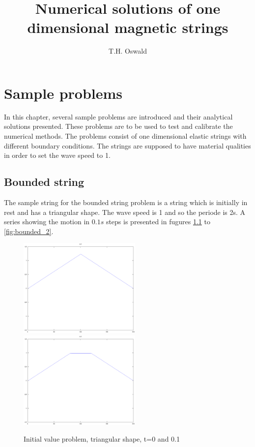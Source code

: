 \documentclass[a4paper,10pt]{report}
\title{Numerical solutions of one dimensional magnetic strings}
\author{T.H. Oswald}
\begin{document}
\maketitle

\begin{abstract}
\end{abstract}

\chapter{Sample problems}
In this chapter, several sample problems are introduced and their analytical solutions presented. These problems are to be used to test and 
calibrate the numerical methods. The problems consist of one dimensional elastic strings with different boundary conditions. The strings 
are supposed to have material qualities in order to set the wave speed to 1.

\section{Bounded string}
The sample string for the bounded string problem is a string which is initially in rest and has a triangular shape. The wave speed is 1 and so the periode
is 2s. A series showing the motion in $0.1s$ steps is presented in fugures \ref{fig:bounded_1} to \ref{fig:bounded_2}.

\label{sec: bounded}

\begin{figure}
\label{fig:bounded_1}
 \includegraphics[width=6cm]{./fixed_ends_analytic_t0.eps}
\includegraphics[width=6cm]{./fixed_ends_analytic_t0.1.eps}

\caption{Initial value problem, triangular shape, t=0 and 0.1}
\end{figure} 
\end{document}

